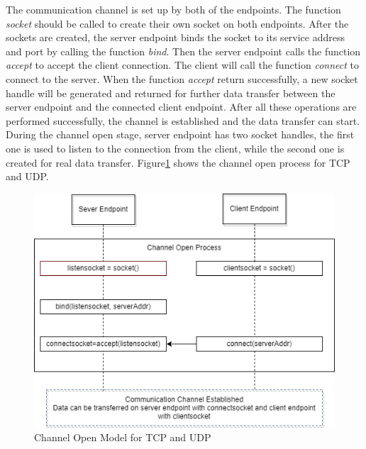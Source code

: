 The communication channel is set up by both of the endpoints. The function \textit{socket} should be called to create their own socket on both endpoints. After the sockets are created, the server endpoint binds the socket to its service address and port by calling the function \textit{bind}. Then the server endpoint calls the function  \textit{accept} to accept the client connection. The client will call the function \textit{connect} to connect to the server. When the function \textit{accept} return successfully, a new socket handle will be generated and returned for further data transfer between the server endpoint and  the connected client endpoint. After all these operations are performed successfully, the channel is established and the data transfer can start. During the channel open stage, server endpoint has two socket handles, the first one is used to listen to the connection from the client, while the second one is created for real data transfer. Figure\ref{channelopen2} shows the channel open process for TCP and UDP.
    
\begin{figure}[H]
\centerline{\includegraphics[scale=0.55]{Figures/tcpudpchannelopen}}
 \caption{Channel Open Model for TCP and UDP}
\label{channelopen2}    
\end{figure}


